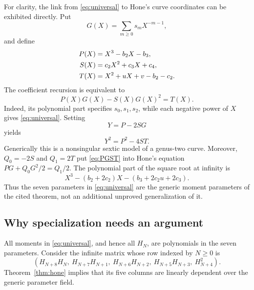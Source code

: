 \documentclass[11pt,letterpaper]{article}
\numberwithin{equation}{section}
\theoremstyle{definition}
\begin{document}
For clarity, the link from \eqref{eq:universal} to Hone's curve coordinates
can be exhibited directly. Put
\begin{equation}
 G(X)=\sum_{m\geq0}s_mX^{-m-1},
\end{equation}
and define
\begin{align}
 P(X)&=X^3-b_2X-b_3,\notag\\
 S(X)&=c_2X^2+c_3X+c_4,\notag\\
 T(X)&=X^2+uX+v-b_2-c_2.
 \label{eq:univPST}
\end{align}
The coefficient recursion is equivalent to
\begin{equation}
 P(X)G(X)-S(X)G(X)^2=T(X).
 \label{eq:PGST}
\end{equation}
Indeed, its polynomial part specifies \(s_0,s_1,s_2\), while each negative
power of \(X\) gives \eqref{eq:universal}. Setting
\begin{equation}
 Y=P-2SG
\end{equation}
yields
\begin{equation}
 Y^2=P^2-4ST.
 \label{eq:sextic}
\end{equation}
Generically this is a nonsingular sextic model of a genus-two curve. Moreover,
\(Q_0=-2S\) and \(Q_1=2T\) put \eqref{eq:PGST} into Hone's equation
\(PG+Q_0G^2/2=Q_1/2\). The polynomial part of the square root at infinity is
\begin{equation}
 X^3-(b_2+2c_2)X-(b_3+2c_2u+2c_3).
\end{equation}
Thus the seven parameters in \eqref{eq:universal} are the generic moment
parameters of the cited theorem, not an additional unproved generalization
of it.

\subsection{Why specialization needs an argument}

All moments in \eqref{eq:universal}, and hence all \(H_N\), are polynomials
in the seven parameters. Consider the infinite matrix whose row indexed by
\(N\geq0\) is
\begin{equation}
 (H_{N+8}H_N,\ H_{N+7}H_{N+1},\ H_{N+6}H_{N+2},\
  H_{N+5}H_{N+3},\ H_{N+4}^2).
 \label{eq:universalmatrix}
\end{equation}
Theorem~\ref{thm:hone} implies that its five columns are linearly dependent
over the generic parameter field.
\end{document}
